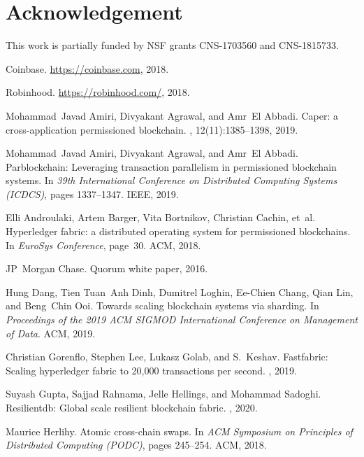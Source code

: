\documentclass[11pt]{article}
\begin{document}
\section*{Acknowledgement}

This work is partially funded by NSF grants CNS-1703560 and CNS-1815733.

\begin{thebibliography}{10}

Coinbase.
\newblock \url{https://coinbase.com}, 2018.

Robinhood.
\newblock \url{https://robinhood.com/}, 2018.

Mohammad~Javad Amiri, Divyakant Agrawal, and Amr~El Abbadi.
\newblock Caper: a cross-application permissioned blockchain.
, 12(11):1385--1398, 2019.

Mohammad~Javad Amiri, Divyakant Agrawal, and Amr~El Abbadi.
\newblock Parblockchain: Leveraging transaction parallelism in permissioned
  blockchain systems.
\newblock In {\em 39th International Conference on Distributed Computing
  Systems (ICDCS)}, pages 1337--1347. IEEE, 2019.

Elli Androulaki, Artem Barger, Vita Bortnikov, Christian Cachin, et~al.
\newblock Hyperledger fabric: a distributed operating system for permissioned
  blockchains.
\newblock In {\em EuroSys Conference}, page~30. ACM, 2018.

JP~Morgan Chase.
\newblock Quorum white paper, 2016.

Hung Dang, Tien Tuan~Anh Dinh, Dumitrel Loghin, Ee-Chien Chang, Qian Lin, and
  Beng~Chin Ooi.
\newblock Towards scaling blockchain systems via sharding.
\newblock In {\em Proceedings of the 2019 ACM SIGMOD International Conference
  on Management of Data}. ACM, 2019.

Christian Gorenflo, Stephen Lee, Lukasz Golab, and S.~Keshav.
\newblock Fastfabric: Scaling hyperledger fabric to 20,000 transactions per
  second.
, 2019.

Suyash Gupta, Sajjad Rahnama, Jelle Hellings, and Mohammad Sadoghi.
\newblock Resilientdb: Global scale resilient blockchain fabric.
, 2020.

Maurice Herlihy.
\newblock Atomic cross-chain swaps.
\newblock In {\em ACM Symposium on Principles of Distributed Computing (PODC)},
  pages 245--254. ACM, 2018.


\end{thebibliography}
\end{document}
